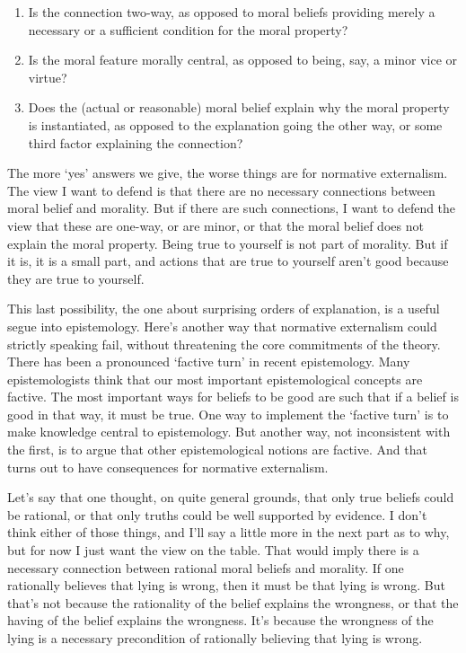 \begin{enumerate}
\item{} Is the connection two-way, as opposed to moral beliefs providing merely a necessary or a sufficient condition for the moral property?

\item{} Is the moral feature morally central, as opposed to being, say, a minor vice or virtue?

\item{} Does the (actual or reasonable) moral belief explain why the moral property is instantiated, as opposed to the explanation going the other way, or some third factor explaining the connection?

\end{enumerate}
The more `yes' answers we give, the worse things are for normative externalism. The view I want to defend is that there are no necessary connections between moral belief and morality. But if there are such connections, I want to defend the view that these are one-way, or are minor, or that the moral belief does not explain the moral property. Being true to yourself is not part of morality. But if it is, it is a small part, and actions that are true to yourself aren't good because they are true to yourself.

This last possibility, the one about surprising orders of explanation, is a useful segue into epistemology. Here's another way that normative externalism could strictly speaking fail, without threatening the core commitments of the theory. There has been a pronounced `factive turn' in recent epistemology. Many epistemologists think that our most important epistemological concepts are factive. The most important ways for beliefs to be good are such that if a belief is good in that way, it must be true. One way to implement the `factive turn' is to make knowledge central to epistemology. But another way, not inconsistent with the first, is to argue that other epistemological notions are factive. And that turns out to have consequences for normative externalism.

Let's say that one thought, on quite general grounds, that only true beliefs could be rational, or that only truths could be well supported by evidence. I don't think either of those things, and I'll say a little more in the next part as to why, but for now I just want the view on the table. That would imply there is a necessary connection between rational moral beliefs and morality. If one rationally believes that lying is wrong, then it must be that lying is wrong. But that's not because the rationality of the belief explains the wrongness, or that the having of the belief explains the wrongness. It's because the wrongness of the lying is a necessary precondition of rationally believing that lying is wrong.


